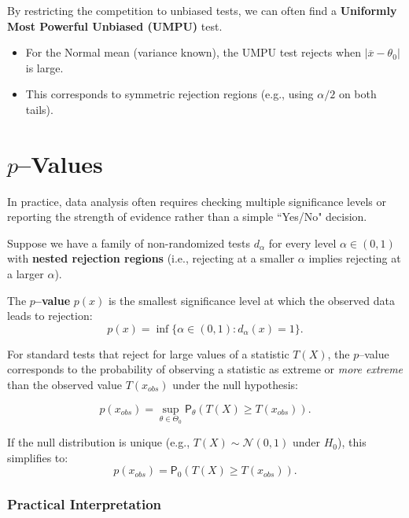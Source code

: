 By restricting the competition to unbiased tests, we can often find a \textbf{Uniformly Most Powerful Unbiased (UMPU)} test.
\begin{itemize}
    \item For the Normal mean (variance known), the UMPU test rejects when $| \overline{x} - \theta_0 |$ is large.
    \item This corresponds to symmetric rejection regions (e.g., using $\alpha/2$ on both tails).
\end{itemize}

\section{\(p\)--Values}
\label{sec:p_values}

In practice, data analysis often requires checking multiple significance levels or reporting the strength of evidence rather than a simple ``Yes/No" decision.


Suppose we have a family of non-randomized tests $d_\alpha$ for every level $\alpha \in (0,1)$ with \textbf{nested rejection regions} (i.e., rejecting at a smaller $\alpha$ implies rejecting at a larger $\alpha$).

\begin{definition}[\(p\)--value]
The \textbf{\(p\)--value} $p(x)$ is the smallest significance level at which the observed data leads to rejection:
\[ 
p(x) = \inf \{ \alpha \in (0,1) : d_\alpha(x) = 1 \}.
\]
\end{definition}

For standard tests that reject for large values of a statistic $T(X)$, the \(p\)--value corresponds to the probability of observing a statistic as extreme or \textit{more extreme} than the observed value $T(x_{obs})$ under the null hypothesis:

\[ 
p(x_{obs}) = \sup_{\theta \in \Theta_0} \mathsf{P}_{\theta} \left( T(X) \ge T(x_{obs}) \right). 
\]

If the null distribution is unique (e.g., $T(X) \sim \mathcal{N}(0,1)$ under $H_0$), this simplifies to:
\[ 
p(x_{obs}) = \mathsf{P}_0(T(X) \ge T(x_{obs})). 
\]

\subsubsection{Practical Interpretation}

